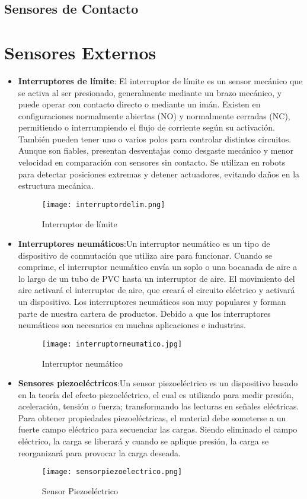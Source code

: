 	\subsection{Sensores de Contacto}
\section{Sensores Externos}
\begin{itemize}
	\item \textbf{Interruptores de límite}: El interruptor de límite es un sensor mecánico que se activa al ser presionado, generalmente mediante un brazo mecánico, y puede operar con contacto directo o mediante un imán. Existen en configuraciones normalmente abiertas (NO) y normalmente cerradas (NC), permitiendo o interrumpiendo el flujo de corriente según su activación. También pueden tener uno o varios polos para controlar distintos circuitos. Aunque son fiables, presentan desventajas como desgaste mecánico y menor velocidad en comparación con sensores sin contacto. Se utilizan en robots para detectar posiciones extremas y detener actuadores, evitando daños en la estructura mecánica.
	\begin{figure}[H]
		\centering
		\texttt{[image: interruptordelim.png]}
		\caption{Interruptor de límite}
	\end{figure}
	
	\item \textbf{Interruptores neumáticos}:Un interruptor neumático es un tipo de dispositivo de conmutación que utiliza aire para funcionar. Cuando se comprime, el interruptor neumático envía un soplo o una bocanada de aire a lo largo de un tubo de PVC hasta un interruptor de aire. El movimiento del aire activará el interruptor de aire, que creará el circuito eléctrico y activará un dispositivo. Los interruptores neumáticos son muy populares y forman parte de nuestra cartera de productos. Debido a que los interruptores neumáticos son necesarios en muchas aplicaciones e industrias.
	\begin{figure}[H]
		\centering
		\texttt{[image: interruptorneumatico.jpg]}
		\caption{Interruptor neumático}
	\end{figure}
	
	
	\item \textbf{Sensores piezoeléctricos}:Un sensor piezoeléctrico es un dispositivo basado en la teoría del efecto piezoeléctrico, el cual es utilizado para medir presión, aceleración, tensión o fuerza; transformando las lecturas en señales eléctricas. Para obtener propiedades piezoeléctricas, el material debe someterse a un fuerte campo eléctrico para secuenciar las cargas. Siendo eliminado el campo eléctrico, la carga se liberará y cuando se aplique presión, la carga se reorganizará para provocar la carga deseada. 
	\begin{figure}[H]
		\centering
		\texttt{[image: sensorpiezoelectrico.png]}
		\caption{Sensor Piezoeléctrico}
	\end{figure}
	

\end{itemize}
